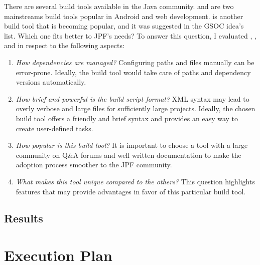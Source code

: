 \documentclass[a4paper, 12pt]{article}
\begin{document}
There are several build tools available in the Java community.
\maven{} and \gradle{} are two mainstreams build tools popular in Android and
web development.
\sbt{}\cite{page:sbt} is another build tool that is becoming popular, and it
was suggested in the GSOC idea's list\cite{page:jpf-gsoc18}.
Which one fits better to JPF's needs?
To answer this question, I evaluated \maven{}, \gradle{}, and \sbt{} in respect
to the following aspects:

\begin{enumerate}
\item \emph{How dependencies are managed?} Configuring paths and \jar{}
files manually can be error-prone. Ideally, the build tool would take care of
paths and dependency versions automatically.
\item \emph{How brief and powerful is the build script format?} XML syntax may
lead to overly verbose and large files for sufficiently large projects.
Ideally, the chosen build tool offers a friendly and brief syntax and provides
an easy way to create user-defined tasks.
\item \emph{How popular is this build tool?} It is important to choose a tool
with a large community on Q\&A forums and well written documentation to make
the adoption process smoother to the JPF community.
\item \emph{What makes this tool unique compared to the others?} This question
highlights features that may provide advantages in favor of this particular
build tool.
\end{enumerate}

\subsection{Results}
\label{sec:results}


\section{Execution Plan}
\label{sec:plan}




\end{document}
